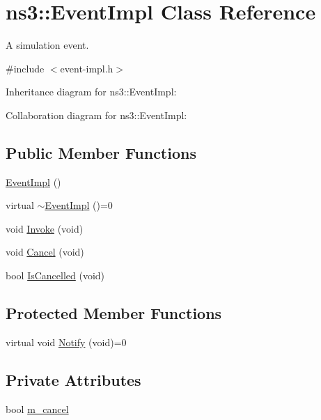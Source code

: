 \hypertarget{classns3_1_1EventImpl}{}\section{ns3\+:\+:Event\+Impl Class Reference}
\label{classns3_1_1EventImpl}


A simulation event.  




{\ttfamily \#include $<$event-\/impl.\+h$>$}



Inheritance diagram for ns3\+:\+:Event\+Impl\+:


Collaboration diagram for ns3\+:\+:Event\+Impl\+:
\subsection*{Public Member Functions}
\begin{DoxyCompactItemize}
\item 
\hyperlink{classns3_1_1EventImpl_a26ff70b19449c64310a6c36569086eee}{Event\+Impl} ()
\item 
virtual \hyperlink{classns3_1_1EventImpl_a9971bf52cdfa7f70c9119cbefaa81198}{$\sim$\+Event\+Impl} ()=0
\item 
void \hyperlink{classns3_1_1EventImpl_a5ce561412ea89951be67fc19d389df32}{Invoke} (void)
\item 
void \hyperlink{classns3_1_1EventImpl_a9685fbe7005b7087653f6dcda96047dd}{Cancel} (void)
\item 
bool \hyperlink{classns3_1_1EventImpl_a0f9aaefb05ad36ba65a5ee3181fd1305}{Is\+Cancelled} (void)
\end{DoxyCompactItemize}
\subsection*{Protected Member Functions}
\begin{DoxyCompactItemize}
\item 
virtual void \hyperlink{classns3_1_1EventImpl_aa2bee27987ecafb67ea493f9fc6047a6}{Notify} (void)=0
\end{DoxyCompactItemize}
\subsection*{Private Attributes}
\begin{DoxyCompactItemize}
\item 
bool \hyperlink{classns3_1_1EventImpl_ab2efa97367b1e26055ed01f86b00be4e}{m\+\_\+cancel}
\end{DoxyCompactItemize}
